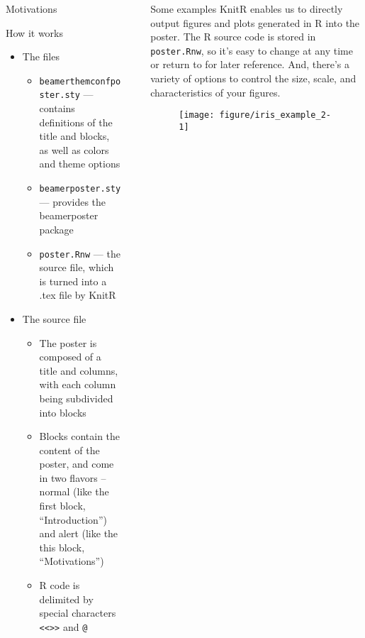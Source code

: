 \documentclass[capfont, final]{beamer}\usepackage[]{graphicx}\usepackage[]{color}
\newenvironment{knitrout}{}{} %
\newlength{\sepwid}
\newlength{\onecolwid}
\newlength{\twocolwid}
\begin{document}
\begin{frame}[t, fragile]
\begin{columns}[T]
\begin{column}{\onecolwid}
\begin{alertblock}{Motivations}
\begin{itemize}
\begin{itemize}
								\end{itemize}
						\end{itemize}
				\end{alertblock}
				\begin{block}{How it works}
						\begin{itemize}
							\item The files
								\begin{itemize}
									\item \texttt{beamerthemconfposter.sty} --- contains definitions of the title and blocks, as well as colors and theme options
									\item \texttt{beamerposter.sty} --- provides the beamerposter package
									\item \texttt{poster.Rnw} --- the source file, which is turned into a .tex file by KnitR
								\end{itemize}
							\item The source file
								\begin{itemize}
							\item The poster is composed of a title and columns, with each column being subdivided into blocks
							\item Blocks contain the content of the poster, and come in two flavors -- normal (like the first block, ``Introduction'') and alert (like the this block, ``Motivations'')
							\item R code is delimited by special characters \texttt{<<>>} and \texttt{@}
								\end{itemize}
						\end{itemize}
				\end{block}
		\end{column} %
		\begin{column}{\sepwid}\end{column} %
		\begin{column}{\twocolwid} %
				\begin{block}{Some examples}
					KnitR enables us to directly output figures and plots generated in R into the poster. The R source code is stored in \texttt{poster.Rnw}, so it's easy to change at any time or return to for later reference. And, there's a variety of options to control the size, scale, and characteristics of your figures. 

\begin{figure}
\begin{knitrout}\small
{}\color{fgcolor}
\texttt{[image: figure/iris\_example\_2-1]} 


\end{knitrout}
\end{figure}
\end{block}
\end{column}
\end{columns}
\end{frame}
\end{document}
